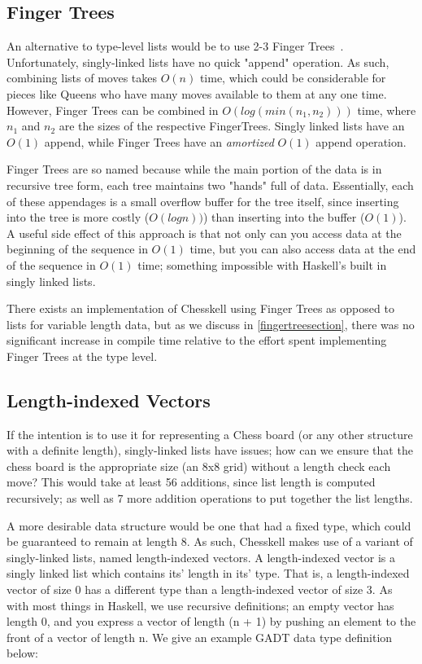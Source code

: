 \subsection{Finger Trees}

An alternative to type-level lists would be to use 2-3 Finger Trees~\cite{fingertrees}. Unfortunately, singly-linked lists have no quick "append" operation. As such, combining lists of moves takes $O(n)$ time, which could be considerable for pieces like Queens who have many moves available to them at any one time. However, Finger Trees can be combined in $O(log(min(n_{1}, n_{2})))$ time, where $n_{1}$ and $n_{2}$ are the sizes of the respective FingerTrees. Singly linked lists have an $O(1)$ append, while Finger Trees have an \emph{amortized} $O(1)$ append operation.

Finger Trees are so named because while the main portion of the data is in recursive tree form, each tree maintains two "hands" full of data. Essentially, each of these appendages is a small overflow buffer for the tree itself, since inserting into the tree is more costly ($O(log n))$) than inserting into the buffer ($O(1)$). A useful side effect of this approach is that not only can you access data at the beginning of the sequence in $O(1)$ time, but you can also access data at the end of the sequence in $O(1)$ time; something impossible with Haskell's built in singly linked lists.

There exists an implementation of Chesskell using Finger Trees as opposed to lists for variable length data, but as we discuss in \cref{fingertreesection}, there was no significant increase in compile time relative to the effort spent implementing Finger Trees at the type level.

\subsection{Length-indexed Vectors} \label{lengthindexedvectors}

If the intention is to use it for representing a Chess board (or any other structure with a definite length), singly-linked lists have issues; how can we ensure that the chess board is the appropriate size (an 8x8 grid) without a length check each move? This would take at least 56 additions, since list length is computed recursively; as well as 7 more addition operations to put together the list lengths.

A more desirable data structure would be one that had a fixed type, which could be guaranteed to remain at length 8. As such, Chesskell makes use of a variant of singly-linked lists, named length-indexed vectors. A length-indexed vector is a singly linked list which contains its' length in its' type. That is, a length-indexed vector of size 0 has a different type than a length-indexed vector of size 3. As with most things in Haskell, we use recursive definitions; an empty vector has length 0, and you express a vector of length (n + 1) by pushing an element to the front of a vector of length n. We give an example GADT data type definition below:

